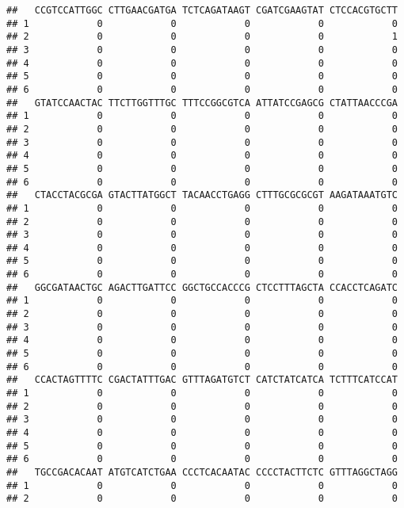 \documentclass[]{article}
\begin{document}
\begin{verbatim}
##   CCGTCCATTGGC CTTGAACGATGA TCTCAGATAAGT CGATCGAAGTAT CTCCACGTGCTT
## 1            0            0            0            0            0
## 2            0            0            0            0            1
## 3            0            0            0            0            0
## 4            0            0            0            0            0
## 5            0            0            0            0            0
## 6            0            0            0            0            0
##   GTATCCAACTAC TTCTTGGTTTGC TTTCCGGCGTCA ATTATCCGAGCG CTATTAACCCGA
## 1            0            0            0            0            0
## 2            0            0            0            0            0
## 3            0            0            0            0            0
## 4            0            0            0            0            0
## 5            0            0            0            0            0
## 6            0            0            0            0            0
##   CTACCTACGCGA GTACTTATGGCT TACAACCTGAGG CTTTGCGCGCGT AAGATAAATGTC
## 1            0            0            0            0            0
## 2            0            0            0            0            0
## 3            0            0            0            0            0
## 4            0            0            0            0            0
## 5            0            0            0            0            0
## 6            0            0            0            0            0
##   GGCGATAACTGC AGACTTGATTCC GGCTGCCACCCG CTCCTTTAGCTA CCACCTCAGATC
## 1            0            0            0            0            0
## 2            0            0            0            0            0
## 3            0            0            0            0            0
## 4            0            0            0            0            0
## 5            0            0            0            0            0
## 6            0            0            0            0            0
##   CCACTAGTTTTC CGACTATTTGAC GTTTAGATGTCT CATCTATCATCA TCTTTCATCCAT
## 1            0            0            0            0            0
## 2            0            0            0            0            0
## 3            0            0            0            0            0
## 4            0            0            0            0            0
## 5            0            0            0            0            0
## 6            0            0            0            0            0
##   TGCCGACACAAT ATGTCATCTGAA CCCTCACAATAC CCCCTACTTCTC GTTTAGGCTAGG
## 1            0            0            0            0            0
## 2            0            0            0            0            0

\end{verbatim}
\end{document}
